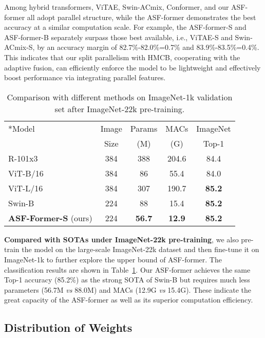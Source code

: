 \documentclass[lettersize,journal]{IEEEtran}
\begin{document}
Among hybrid transformers, ViTAE, Swin-ACmix, Conformer, and our ASF-former all adopt parallel structure, while the ASF-former demonstrates the best accuracy at a similar computation scale. For example, the ASF-former-S and ASF-former-B separately surpass those best available, i.e., ViTAE-S and Swin-ACmix-S, by an accuracy margin of 82.7\%-82.0\%=0.7\% and 83.9\%-83.5\%=0.4\%. This indicates that our split parallelism with HMCB, cooperating with the adaptive fusion, can efficiently enforce the model to be lightweight and effectively boost performance via integrating parallel features.

\setlength{\tabcolsep}{4pt}
\begin{table}
\begin{center}
\caption{Comparison with different methods on ImageNet-1k validation set after ImageNet-22k pre-training.}
\label{table:22k}
\begin{tabular}{lcccc}
\hline\noalign{\smallskip}
\multirow{2}*{Model} &Image &Params &MACs &ImageNet\\
 &Size &(M) &(G) &Top-1\\
\noalign{\smallskip}
\hline
\noalign{\smallskip}
R-101x3~\cite{Kolesnikov2020BigT}& 384 &388 &204.6 &84.4\\
ViT-B/16~\cite{dosovitskiy2021an} &384 &86 &55.4 &84.0\\
ViT-L/16~\cite{dosovitskiy2021an} &384 &307 &190.7 &\textbf{85.2}\\
Swin-B~\cite{liu2021Swin}&224 &88 &15.4 &\textbf{85.2}\\
\midrule
\textbf{ASF-Former-S} (ours) &224 &\textbf{56.7} &\textbf{12.9} &\textbf{85.2}\\
\hline
\end{tabular}
\end{center}
\end{table}
\setlength{\tabcolsep}{1.4pt}

\textbf{Compared with SOTAs under ImageNet-22k pre-training}, we also pre-train the model on the large-scale ImageNet-22k dataset and then fine-tune it on ImageNet-1k to further explore the upper bound of ASF-former. The classification results are shown in Table~\ref{table:22k}. Our ASF-former achieves the same Top-1 accuracy (85.2\%) as the strong SOTA of Swin-B but requires much less parameters (56.7M \textit{vs} 88.0M) and MACs (12.9G \textit{vs} 15.4G). These indicate the great capacity of the ASF-former as well as its superior computation efficiency.

\subsection{Distribution of Weights}
\end{document}
